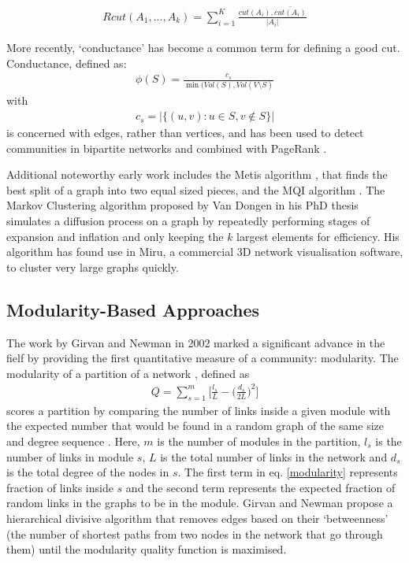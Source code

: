 \documentclass{report}
\begin{document}
\begin{align*}
    Rcut(A_1,...,A_k) = \sum_{i=1}^K \frac{cut(A_i),\bar{cut(A_i)}}{|A_i|}
\end{align*}

More recently, `conductance' has become a common term for defining a good cut. Conductance, defined as:
\begin{align*}
\phi(S) = \frac{c_s}{\min(Vol(S),Vol(V \setminus S)} 
\end{align*}
with
\begin{align*}
c_s = |\{(u,v) : u \in S, v \not\in S\}|
\end{align*}
is concerned with edges, rather than vertices, and has been used to detect communities in bipartite networks \cite{barber2007modularity} and combined with PageRank \cite{andersen2006local}. 

Additional noteworthy early work includes the Metis algorithm \cite{karypis1998fast}, that finds the best split of a graph into two equal sized pieces, and the MQI algorithm \cite{gallo1989fast,lang2004flow}. The Markov Clustering algorithm proposed by Van Dongen in his PhD thesis \cite{van2001graph} simulates a diffusion process on a graph by repeatedly performing stages of expansion and inflation and only keeping the $k$ largest elements for efficiency. His algorithm has found use in Miru, a commercial 3D network visualisation software, to cluster very large graphs quickly.

\subsection{Modularity-Based Approaches}
The work by Girvan and Newman \cite{girvan2002community} in 2002 marked a significant advance in the fielf by providing the first quantitative measure of a community: modularity. The modularity of a partition of a network \cite{newman2004finding}, defined as 
\begin{align} \label{modularity}
    Q = \sum_{s=1}^m \bigg[ \frac{l_s}{L} - \bigg( \frac{d_s}{2L} \bigg)^2\bigg]
\end{align}
scores a partition by comparing the number of links inside a given module with the expected number that would be found in a random graph of the same size and degree sequence \cite{fortunato2007resolution}. Here, $m$ is the number of modules in the partition, $l_s$ is the number of links in module $s$, $L$ is the total number of links in the network and $d_s$ is the total degree of the nodes in $s$. The first term in eq. \ref{modularity} represents fraction of links inside $s$ and the second term represents the expected fraction of random links in the graphs to be in the module. Girvan and Newman propose a hierarchical divisive algorithm that removes edges based on their `betweenness' (the number of shortest paths from two nodes in the network that go through them) until the modularity quality function is maximised. 
\end{document}
